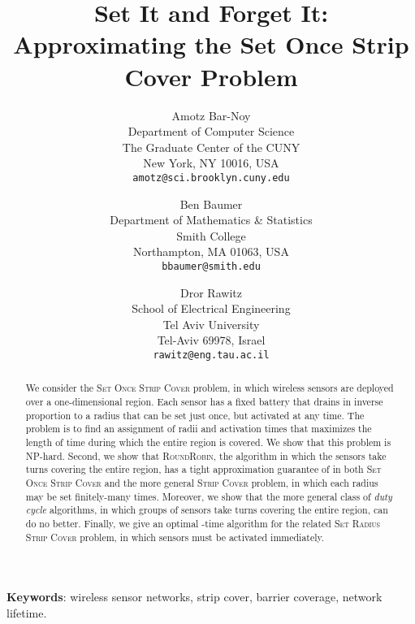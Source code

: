 \documentclass[11pt]{article}
\newcommand{\strip}{\textsc{Strip Cover}\xspace}
\newcommand{\sosclong}{\textsc{Set Once Strip Cover}\xspace}
\newcommand{\srsclong}{\textsc{Set Radius Strip Cover}\xspace}
\newcommand{\rr}{\textsc{RoundRobin}\xspace}
\begin{document}
\title{\bf Set It and Forget It: \\
Approximating the Set Once Strip Cover Problem}

\author{Amotz Bar-Noy \\
Department of Computer Science \\
The Graduate Center of the CUNY \\
New York, NY 10016, USA \\
\texttt{amotz@sci.brooklyn.cuny.edu}
\and
Ben Baumer \\
Department of Mathematics \& Statistics \\
Smith College \\
Northampton, MA 01063, USA \\
\texttt{bbaumer@smith.edu}
\and
Dror Rawitz \\
School of Electrical Engineering \\
Tel Aviv University \\
Tel-Aviv 69978, Israel \\
\texttt{rawitz@eng.tau.ac.il}
}



\begin{titlepage}

\maketitle

\begin{abstract}
We consider the \sosclong problem, in which  wireless sensors are
deployed over a one-dimensional region. Each sensor has a fixed
battery that drains in inverse proportion to a radius that can be set
just once, but activated at any time.  The problem is to find an
assignment of radii and activation times that maximizes the length of
time during which the entire region is covered.  We show that this
problem is NP-hard. Second, we show that \rr, the algorithm in which
the sensors take turns covering the entire region, has a tight
approximation guarantee of  in both \sosclong and the
more general \strip problem, in which each radius may be set
finitely-many times. Moreover, we show that the more general class of
\emph{duty cycle} algorithms, in which groups of sensors take turns
covering the entire region, can do no better. Finally, we give an
optimal -time algorithm for the related \srsclong
problem, in which sensors must be activated immediately.
\end{abstract}



\medskip
\noindent
\textbf{Keywords}:
wireless sensor networks,
strip cover,
barrier coverage,
network lifetime.

\thispagestyle{empty}
\end{titlepage}
\end{document}

